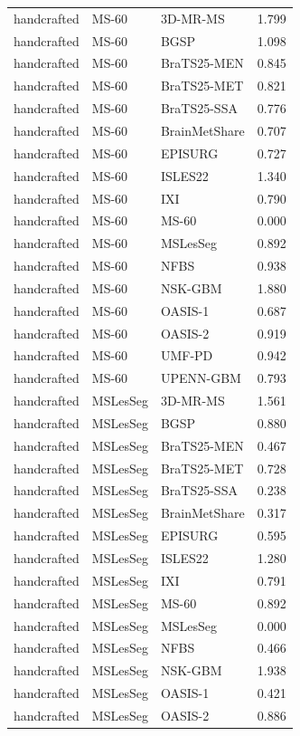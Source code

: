 \begin{tabular}{lllr}
handcrafted & MS-60 & 3D-MR-MS & 1.799 \\
handcrafted & MS-60 & BGSP & 1.098 \\
handcrafted & MS-60 & BraTS25-MEN & 0.845 \\
handcrafted & MS-60 & BraTS25-MET & 0.821 \\
handcrafted & MS-60 & BraTS25-SSA & 0.776 \\
handcrafted & MS-60 & BrainMetShare & 0.707 \\
handcrafted & MS-60 & EPISURG & 0.727 \\
handcrafted & MS-60 & ISLES22 & 1.340 \\
handcrafted & MS-60 & IXI & 0.790 \\
handcrafted & MS-60 & MS-60 & 0.000 \\
handcrafted & MS-60 & MSLesSeg & 0.892 \\
handcrafted & MS-60 & NFBS & 0.938 \\
handcrafted & MS-60 & NSK-GBM & 1.880 \\
handcrafted & MS-60 & OASIS-1 & 0.687 \\
handcrafted & MS-60 & OASIS-2 & 0.919 \\
handcrafted & MS-60 & UMF-PD & 0.942 \\
handcrafted & MS-60 & UPENN-GBM & 0.793 \\
handcrafted & MSLesSeg & 3D-MR-MS & 1.561 \\
handcrafted & MSLesSeg & BGSP & 0.880 \\
handcrafted & MSLesSeg & BraTS25-MEN & 0.467 \\
handcrafted & MSLesSeg & BraTS25-MET & 0.728 \\
handcrafted & MSLesSeg & BraTS25-SSA & 0.238 \\
handcrafted & MSLesSeg & BrainMetShare & 0.317 \\
handcrafted & MSLesSeg & EPISURG & 0.595 \\
handcrafted & MSLesSeg & ISLES22 & 1.280 \\
handcrafted & MSLesSeg & IXI & 0.791 \\
handcrafted & MSLesSeg & MS-60 & 0.892 \\
handcrafted & MSLesSeg & MSLesSeg & 0.000 \\
handcrafted & MSLesSeg & NFBS & 0.466 \\
handcrafted & MSLesSeg & NSK-GBM & 1.938 \\
handcrafted & MSLesSeg & OASIS-1 & 0.421 \\
handcrafted & MSLesSeg & OASIS-2 & 0.886 \\

\end{tabular}
